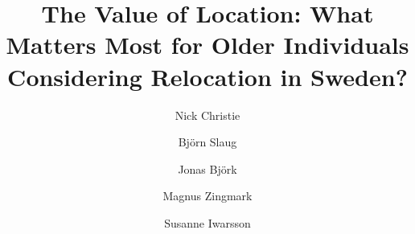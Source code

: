\documentclass[3p,11pt ]{elsarticle}
\begin{document}
\begin{frontmatter}



\title{The Value of Location: What Matters Most for Older Individuals Considering Relocation in Sweden?}


\author[1]{Nick Christie}

\author[1]{Bj\"orn Slaug}

\author[2]{Jonas Bj\"ork}

\author[1]{Magnus Zingmark}

\author[1]{Susanne Iwarsson}

























\end{frontmatter}
\end{document}
